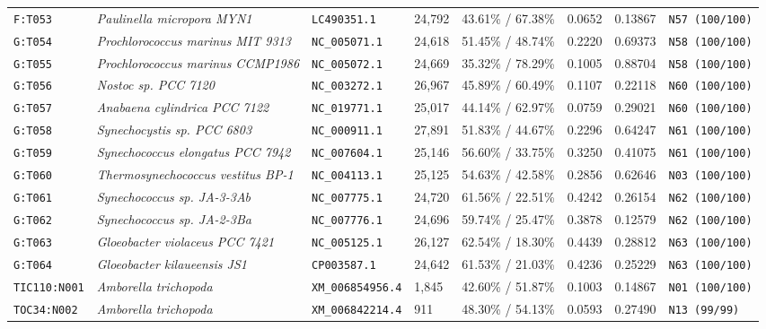 \documentclass[10pt,letterpaper]{article}
\begin{document}
\begin{longtable}{llllllll}
\texttt{F:T053} & \textit{Paulinella micropora MYN1} & \texttt{LC490351.1} & 24,792 & 43.61\% / 67.38\% & 0.0652 & 0.13867 & \texttt{N57 (100/100)} \\
\texttt{G:T054} & \textit{Prochlorococcus marinus MIT 9313} & \texttt{NC\_005071.1} & 24,618 & 51.45\% / 48.74\% & 0.2220 & 0.69373 & \texttt{N58 (100/100)} \\
\texttt{G:T055} & \textit{Prochlorococcus marinus CCMP1986} & \texttt{NC\_005072.1} & 24,669 & 35.32\% / 78.29\% & 0.1005 & 0.88704 & \texttt{N58 (100/100)} \\
\texttt{G:T056} & \textit{Nostoc sp. PCC 7120} & \texttt{NC\_003272.1} & 26,967 & 45.89\% / 60.49\% & 0.1107 & 0.22118 & \texttt{N60 (100/100)} \\
\texttt{G:T057} & \textit{Anabaena cylindrica PCC 7122} & \texttt{NC\_019771.1} & 25,017 & 44.14\% / 62.97\% & 0.0759 & 0.29021 & \texttt{N60 (100/100)} \\
\texttt{G:T058} & \textit{Synechocystis sp. PCC 6803} & \texttt{NC\_000911.1} & 27,891 & 51.83\% / 44.67\% & 0.2296 & 0.64247 & \texttt{N61 (100/100)} \\
\texttt{G:T059} & \textit{Synechococcus elongatus PCC 7942} & \texttt{NC\_007604.1} & 25,146 & 56.60\% / 33.75\% & 0.3250 & 0.41075 & \texttt{N61 (100/100)} \\
\texttt{G:T060} & \textit{Thermosynechococcus vestitus BP-1} & \texttt{NC\_004113.1} & 25,125 & 54.63\% / 42.58\% & 0.2856 & 0.62646 & \texttt{N03 (100/100)} \\
\texttt{G:T061} & \textit{Synechococcus sp. JA-3-3Ab} & \texttt{NC\_007775.1} & 24,720 & 61.56\% / 22.51\% & 0.4242 & 0.26154 & \texttt{N62 (100/100)} \\
\texttt{G:T062} & \textit{Synechococcus sp. JA-2-3Ba} & \texttt{NC\_007776.1} & 24,696 & 59.74\% / 25.47\% & 0.3878 & 0.12579 & \texttt{N62 (100/100)} \\
\texttt{G:T063} & \textit{Gloeobacter violaceus PCC 7421} & \texttt{NC\_005125.1} & 26,127 & 62.54\% / 18.30\% & 0.4439 & 0.28812 & \texttt{N63 (100/100)} \\
\texttt{G:T064} & \textit{Gloeobacter kilaueensis JS1} & \texttt{CP003587.1} & 24,642 & 61.53\% / 21.03\% & 0.4236 & 0.25229 & \texttt{N63 (100/100)} \\
\texttt{TIC110:N001} & \textit{Amborella trichopoda} & \texttt{XM\_006854956.4} & 1,845 & 42.60\% / 51.87\% & 0.1003 & 0.14867 & \texttt{N01 (100/100)} \\
\texttt{TOC34:N002} & \textit{Amborella trichopoda} & \texttt{XM\_006842214.4} & 911 & 48.30\% / 54.13\% & 0.0593 & 0.27490 & \texttt{N13 (99/99)} \\

\end{longtable}
\end{document}
